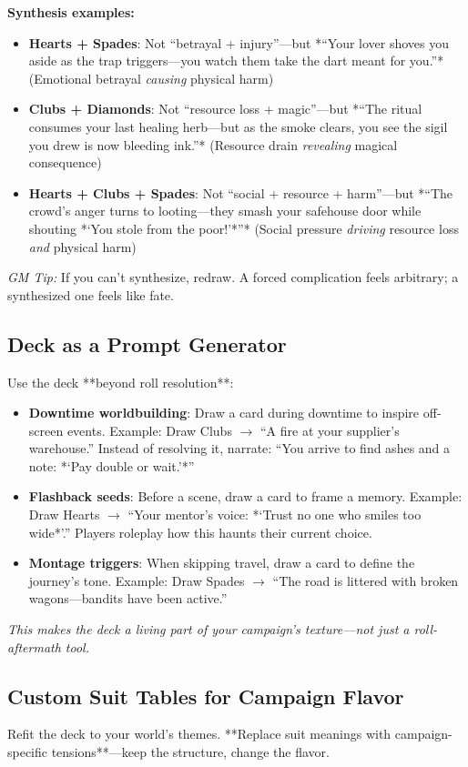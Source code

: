 \textbf{Synthesis examples:}
\begin{itemize}
  \item \textbf{Hearts + Spades}: Not ``betrayal + injury''---but *``Your lover shoves you aside as the trap triggers---you watch them take the dart meant for you.''* (Emotional betrayal \textit{causing} physical harm) 
  \item \textbf{Clubs + Diamonds}: Not ``resource loss + magic''---but *``The ritual consumes your last healing herb---but as the smoke clears, you see the sigil you drew is now bleeding ink.''* (Resource drain \textit{revealing} magical consequence) 
  \item \textbf{Hearts + Clubs + Spades}: Not ``social + resource + harm''---but *``The crowd's anger turns to looting---they smash your safehouse door while shouting *`You stole from the poor!'*''* (Social pressure \textit{driving} resource loss \textit{and} physical harm) 
\end{itemize}
\textit{GM Tip:} If you can't synthesize, redraw. A forced complication feels arbitrary; a synthesized one feels like fate.

\subsection*{Deck as a Prompt Generator}
Use the deck **beyond roll resolution**:
\begin{itemize}
  \item \textbf{Downtime worldbuilding}: Draw a card during downtime to inspire off-screen events. Example: Draw Clubs $\rightarrow$ ``A fire at your supplier's warehouse.'' Instead of resolving it, narrate: ``You arrive to find ashes and a note: *`Pay double or wait.'*'' 
  \item \textbf{Flashback seeds}: Before a scene, draw a card to frame a memory. Example: Draw Hearts $\rightarrow$ ``Your mentor's voice: *`Trust no one who smiles too wide*'.'' Players roleplay how this haunts their current choice. 
  \item \textbf{Montage triggers}: When skipping travel, draw a card to define the journey's tone. Example: Draw Spades $\rightarrow$ ``The road is littered with broken wagons---bandits have been active.'' 
\end{itemize}
\textit{This makes the deck a living part of your campaign's texture---not just a roll-aftermath tool.}

\subsection*{Custom Suit Tables for Campaign Flavor}
Refit the deck to your world's themes. **Replace suit meanings with campaign-specific tensions**---keep the structure, change the flavor.

